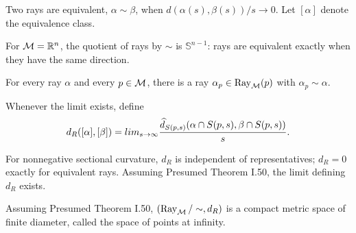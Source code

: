 \begin{definition}
\label{def:chow-iii-i51-ray-equivalence}
Two rays are equivalent, $\alpha\sim\beta$, when
$d(\alpha(s),\beta(s))/s\to0$.  Let $[\alpha]$ denote the equivalence class.
\end{definition}

\begin{example}
\label{ex:chow-iii-i51-euclidean-boundary}
For $\mathcal M=\mathbb R^n$, the quotient of rays by $\sim$ is $\mathbb S^{n-1}$: rays are
equivalent exactly when they have the same direction.
\end{example}

\begin{lemma}
\label{lem:chow-iii-i52-rays-at-basepoint}
For every ray $\alpha$ and every $p\in\mathcal M$, there is a ray $\alpha_p\in\operatorname{Ray}_{\mathcal M}(p)$
with $\alpha_p\sim\alpha$.
\end{lemma}

\begin{definition}
\label{def:chow-iii-i53-ray-distance}
Whenever the limit exists, define
\[
d_R([\alpha],[\beta])=lim_{s\to\infty}
\frac{\widehat d_{S(p,s)}(\alpha\cap S(p,s),\beta\cap S(p,s))}{s}.
\]
\end{definition}

\begin{lemma}
\label{lem:chow-iii-i53-ray-distance-well-defined}
For nonnegative sectional curvature, $d_R$ is independent of representatives;
$d_R=0$ exactly for equivalent rays.  Assuming Presumed Theorem I.50, the
limit defining $d_R$ exists.
\end{lemma}

\begin{claim}
\label{clm:chow-iii-i54-points-at-infinity}
Assuming Presumed Theorem I.50, $(\operatorname{Ray}_{\mathcal M}/\sim,d_R)$ is a compact metric space of
finite diameter, called the space of points at infinity.
\end{claim}

